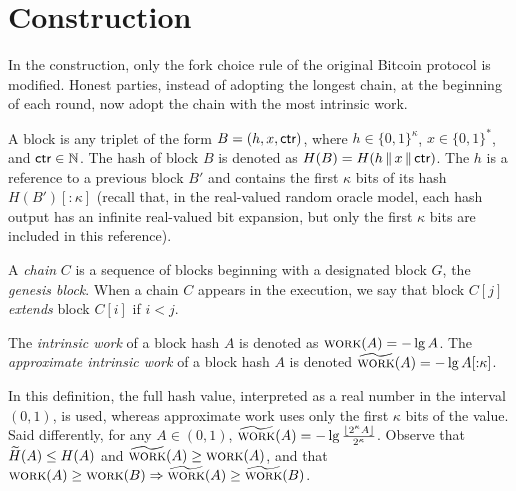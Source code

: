 \section{Construction}
In the \poem construction, only the fork choice rule
of the original Bitcoin protocol is modified.
Honest parties, instead of adopting the longest chain, at the beginning
of each round, now adopt the chain with the most intrinsic work.

A block is any triplet of the
form $B = (h, x, \textsf{ctr})$, where $h \in \{0,1\}^\kappa$, $x \in \{0, 1\}^*$, and $\textsf{ctr} \in \mathbb{N}$.
The hash of block $B$ is denoted as $H(B) = H(h \,\|\, x \,\|\, \textsf{ctr})$.
The $h$ is a reference to a previous block $B'$ and
contains the first $\kappa$ bits of its hash $H(B')[{:}{\kappa}]$
(recall that, in the real-valued random oracle model, each hash
output has an infinite real-valued bit expansion, but only the first
$\kappa$ bits are included in this reference).

A \emph{chain} $C$ is a sequence of blocks beginning with a designated
block $G$, the \emph{genesis block}. When a chain $C$ appears in the execution,
we say that block $C[j]$ \emph{extends} block $C[i]$ if $i < j$.

\begin{definition}
  The \emph{intrinsic work} of a block hash
  $A$ is denoted as $\textsc{work}(A) = -\lg A$.
  The \emph{approximate intrinsic work} of a block hash $A$ is denoted
  $\widetilde{\textsc{work}}(A) = -\lg A[{:}{\kappa}]$.
\end{definition}

In this definition, the full hash value, interpreted as a real number in the interval
$(0, 1)$, is used, whereas approximate work uses only the first $\kappa$ bits of the
value. Said differently, for any $A \in (0, 1)$,
$\widetilde{\textsc{work}}(A) = -\lg \frac{\lfloor 2^\kappa A \rfloor}{2^\kappa}$.
Observe that $\widetilde{H}(A) \leq H(A)$ and $\widetilde{\textsc{work}}(A) \geq \textsc{work}(A)$,
and that $\textsc{work}(A) \geq \textsc{work}(B) \Rightarrow \widetilde{\textsc{work}}(A) \geq \widetilde{\textsc{work}}(B)$.

